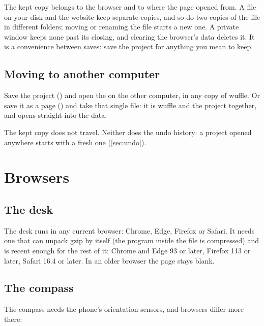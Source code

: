 \begin{caution}
The kept copy belongs to the browser and to where the page opened from. A file on your disk and the
website keep separate copies, and so do two copies of the file in different folders; moving or renaming
the file starts a new one. A private window keeps none past its closing, and clearing the browser's data
deletes it. It is a convenience between saves: save the project for anything you mean to keep.
\end{caution}

\subsection{Moving to another computer}

Save the project () and open the  on the other
computer, in any copy of wuffle. Or save it as a page () and take that single file: it is wuffle and the project together, and opens straight into the
data.

The kept copy does not travel. Neither does the undo history: a project opened anywhere starts with a
fresh one (\cref{sec:undo}).

\section{Browsers}\label{sec:browsers}

\subsection{The desk}

The desk runs in any current browser: Chrome, Edge, Firefox or Safari. It needs one that can unpack
gzip by itself (the program inside the file is compressed) and is recent enough for the rest of it:
Chrome and Edge 93 or later, Firefox 113 or later, Safari 16.4 or later. In an older browser the page stays blank.

\subsection{The compass}\label{sec:compass-browsers}

The compass needs the phone's orientation sensors, and browsers differ more there:

